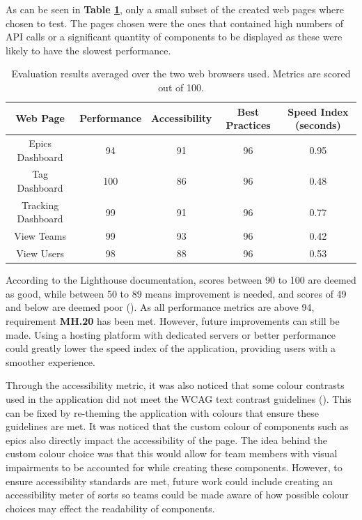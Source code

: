 \documentclass[l4proj.tex]{subfiles}
\begin{document}
As can be seen in \textbf{Table \ref{perfomance-metrics-table}}, only a small subset of the created web pages where chosen to test. The pages chosen were the ones that contained high numbers of API calls or a significant quantity of components to be displayed as these were likely to have the slowest performance. 

\begin{center}
\begin{table}[h!]
\caption{Evaluation results averaged over the two web browsers used. Metrics are scored out of 100.}
\label{perfomance-metrics-table}
\begin{tabular}{| c | c | c | c | c |}
\hline
 Web Page & Performance & Accessibility & Best Practices & Speed Index (seconds) \\ 
 \hline
 Epics Dashboard & 94 & 91 & 96 & 0.95 \\  
 Tag Dashboard & 100 & 86 & 96 & 0.48    \\
 Tracking Dashboard  & 99 & 91 & 96 & 0.77  \\
 View Teams & 99 & 93 & 96 & 0.42 \\
 View Users & 98 & 88 & 96 & 0.53\\
 \hline
\end{tabular}
\end{table}
\end{center}

According to the Lighthouse documentation, scores between 90 to 100 are deemed as good, while between 50 to 89 means improvement is needed, and scores of 49 and below are deemed poor (\cite{LighthouseColourCoding}). As all performance metrics are above 94, requirement \textbf{MH.20} has been met. However, future improvements can still be made. Using a hosting platform with dedicated servers or better performance could greatly lower the speed index of the application, providing users with a smoother experience. 

Through the accessibility metric, it was also noticed that some colour contrasts used in the application did not meet the WCAG text contrast guidelines (\cite{WCAGContrastGuidelines}). This can be fixed by re-theming the application with colours that ensure these guidelines are met. It was noticed that the custom colour of components such as epics also directly impact the accessibility of the page. The idea behind the custom colour choice was that this would allow for team members with visual impairments to be accounted for while creating these components. However, to ensure accessibility standards are met, future work could include creating an accessibility meter of sorts so teams could be made aware of how possible colour choices may effect the readability of components.
\end{document}
